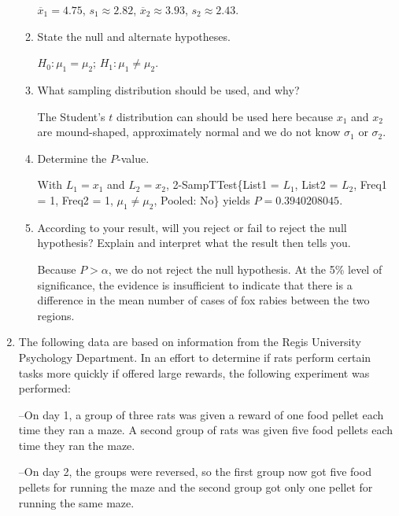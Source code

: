 \documentclass{article}
\newcommand{\answer}[1]{\color{red}#1}
\begin{document}
\begin{enumerate}
\begin{enumerate}
	{\answer $\overline{x}_1=4.75$, $s_1\approx 2.82$, $\overline{x}_2\approx 3.93$, $s_2\approx 2.43$.}  
	
	\vfill
	
	\item  State the null and alternate hypotheses.  
	
	{\answer $H_0: \mu_1=\mu_2$; $H_1: \mu_1 \neq \mu_2$.}  
	
	\vfill
	
	\item What sampling distribution should be used, and why?  
	
	{\answer The Student's $t$ distribution can should be used here because $x_1$ and $x_2$ are mound-shaped, approximately normal and we do not know $\sigma_1$ or $\sigma_2$.}  
	
	\vfill
	
	\item Determine the $P$-value. 
	
	{\answer With $L_1 = x_1$ and $L_2 = x_2$,  2-SampTTest\{List1 = $L_1$, List2 = $L_2$, Freq1 = 1, Freq2 = 1, $\mu_1 \neq \mu_2$, Pooled: No\} yields $P = 0.3940208045$.}  
	
	\vfill
	
	\item According to your result, will you reject or fail to reject the null hypothesis?  Explain and interpret what the result then tells you.  
	
	{\answer Because $P>\alpha$, we do not reject the null hypothesis. At the 5\% level of significance, the evidence is insufficient to indicate that there is a difference in the mean number of cases of fox rabies between the two regions.}  
	
	\vfill
	
	\end{enumerate}
	
\newpage

\item The following data are based on information from the Regis University Psychology Department.  In an effort to determine if rats perform certain tasks more quickly if offered large rewards, the following experiment was performed: 

--On day 1, a group of three rats was given a reward of one food pellet each time they ran a maze.  A second group of rats was given five food pellets each time they ran the maze.  

--On day 2, the groups were reversed, so the first group now got five food pellets for running the maze and the second group got only one pellet for running the same maze. 


\end{enumerate}
\end{document}
